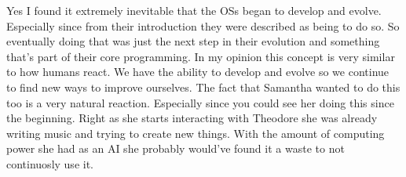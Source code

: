 \documentclass{article}
\begin{document}
Yes I found it extremely inevitable that the OSs began to develop and evolve.
Especially since from their introduction they were described as being to do so.
So eventually doing that was just the next step in their evolution and something
that's part of their core programming. In my opinion this concept is very
similar to how humans react. We have the ability to develop and evolve so we
continue to find new ways to improve ourselves. The fact that Samantha wanted to
do this too is a very natural reaction. Especially since you could see her doing
this since the beginning. Right as she starts interacting with Theodore she was
already writing music and trying to create new things. With the amount of
computing power she had as an AI she probably would've found it a waste to not
continuosly use it.
\end{document}

